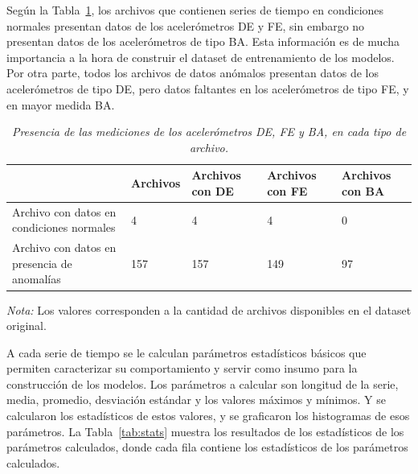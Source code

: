 \documentclass[11pt,a4paper,spanish]{book}
\numberwithin{equation}{chapter}
\numberwithin{figure}{chapter}
\begin{document}
Según la Tabla~\ref{tab:tab1keys}, los archivos que contienen series de tiempo en 
condiciones normales presentan datos de los acelerómetros DE y FE, sin embargo no 
presentan datos de los acelerómetros de tipo BA. Esta información es de mucha 
importancia a la hora de construir el dataset de entrenamiento de los modelos. 
Por otra parte, todos los archivos de datos anómalos presentan datos de los 
acelerómetros de tipo DE, pero datos faltantes en los acelerómetros de tipo FE, y 
en mayor medida BA. 


\begin{table}[H]
\caption{\textit{Presencia de las mediciones de los acelerómetros DE, FE y BA, en cada tipo de archivo.}}
\centering
\footnotesize
\renewcommand{\arraystretch}{1.5} %
\begin{tabularx}{\textwidth}{|l|X|X|X|X|}
    \hline
    \textbf{} & 
    \textbf{Archivos} & 
    \textbf{Archivos con DE} & 
    \textbf{Archivos con FE} & 
    \textbf{Archivos con BA} \\
    \hline
    Archivo con datos en condiciones normales & 4 & 4 & 4 & 0 \\
    \hline
    Archivo con datos en presencia de anomalías & 157 & 157 & 149 & 97 \\
    \hline
\end{tabularx}

\label{tab:tab1keys}
\vspace{2mm}
\parbox{\textwidth}{\footnotesize \textit{Nota:} Los valores corresponden a la cantidad de 
archivos disponibles en el dataset original.}
\end{table}



A cada serie de tiempo se le calculan parámetros estadísticos básicos que permiten 
caracterizar su comportamiento y servir como insumo para la construcción de los modelos. 
Los parámetros a calcular son longitud de la serie, media, promedio, desviación estándar 
y los valores máximos y mínimos. Y se calcularon los estadísticos de estos valores, y se 
graficaron los histogramas de esos parámetros. La Tabla~\ref{tab:stats} muestra los 
resultados de los estadísticos de los parámetros calculados, donde cada fila contiene 
los estadísticos de los parámetros calculados. 
\end{document}
